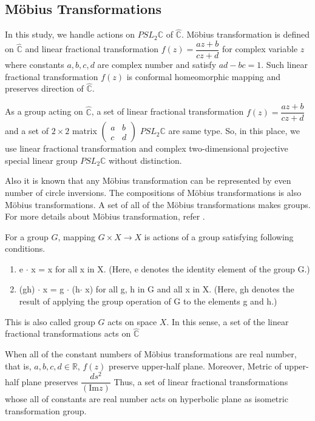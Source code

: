 \subsection{M\"obius Transformations}

In this study, we handle actions on $PSL_2\mathbb{C}$ of $\hat{\mathbb{C}}$.
M\"obius transformation is defined on $\hat{\mathbb{C}}$ and
linear fractional transformation
$f(z)=\dfrac{az+b}{cz+d}$ for complex variable $z$ where constants
$a, b, c, d$ are complex number and satisfy $ad - bc = 1$.
Such linear fractional transformation $f(z)$ is conformal homeomorphic
mapping and preserves direction of $\hat{\mathbb{C}}$.

As a group acting on $\hat{\mathbb{C}}$, a set of linear fractional
transformation $f(z) = \dfrac{az + b}{cz + d}$
and a set of $2 \times 2$ matrix
$\begin{pmatrix}a & b \\ c& d \end{pmatrix}$
$PSL_2\mathbb{C}$ are same type.
So, in this place, we use linear fractional transformation and
complex two-dimensional projective special linear group
$PSL_2\mathbb{C}$ without distinction.

Also it is known that any M\"obius transformation can be represented by
even number of circle inversions.
The compositions of M\"obius transformations is also M\"obius
transformations. A set of all of the M\"obius transformations makes
groups. For more details about M\"obius transformation, refer
\cite{MumfordSeriesWright200204}\cite{marden_2016}.

For a group $G$, mapping $G \times X \to X$ is actions of a group
satisfying following conditions.
\begin{enumerate}
 \item e $\cdot$ x = x for all x in X. (Here, e denotes the identity element of
       the group G.)
 \item (gh) $\cdot$ x = g $\cdot$ (h$\cdot$ x) for all g, h in G and all x in X.
       (Here, gh denotes the result of applying the group operation of G to the elements g and h.)
\end{enumerate}
This is also called group $G$ acts on space $X$.
In this sense, a set of the linear fractional transformations acts on
$\hat{\mathbb{C}}$

When all of the constant numbers of M\"obius transformations are real number,
that is, $a, b, c, d \in \mathbb{R}$, $f(z)$ preserve upper-half plane.
Moreover, Metric of upper-half plane preserves
$\dfrac{ds^2}{(\mathrm{Im}z)}$
Thus, a set of linear fractional transformations whose all of constants
are real number acts on hyperbolic plane as isometric transformation group.

